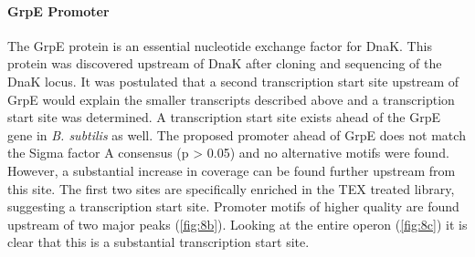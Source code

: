 \paragraph{GrpE Promoter}
The GrpE protein is an essential nucleotide exchange factor for DnaK. This protein was discovered upstream of DnaK after cloning and sequencing of the DnaK locus\cite{79}. It was postulated that a second transcription start site upstream of GrpE would explain the smaller transcripts described above and a transcription start site was determined\cite{79}. A transcription start site exists ahead of the GrpE gene in \textit{B. subtilis} as well\cite{82}. The proposed promoter ahead of GrpE does not match the Sigma factor A consensus (p > 0.05) and no alternative motifs were found. However, a substantial increase in coverage can be found further upstream from this site. The first two sites are specifically enriched in the TEX treated library, suggesting a transcription start site. Promoter motifs of higher quality are found upstream of two major peaks (\ref{fig:8b}). Looking at the entire operon (\ref{fig:8c}) it is clear that this is a substantial transcription start site. 

